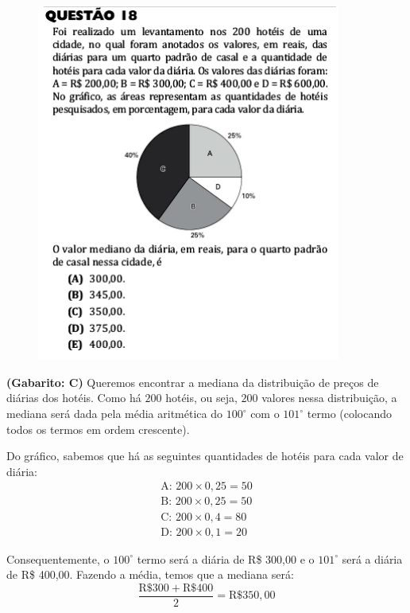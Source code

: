 \documentclass[a4paper]{article}
\begin{document}
\begin{figure}[H]
	\begin{center}
		\includegraphics[width=10cm]{L1Q18.png}
	\end{center}
\end{figure}
\par\textbf{(Gabarito: C)} Queremos encontrar a mediana da distribuição de preços de diárias dos hotéis. Como há $200$ hotéis, ou seja, $200$ valores nessa distribuição, a mediana será dada pela média aritmética do $100^\circ$ com o $101^\circ$ termo (colocando todos os termos em ordem crescente).
\par\vspace{0.3cm} Do gráfico, sabemos que há as seguintes quantidades de hotéis para cada valor de diária:
\begin{align*}
\text{A: }200\times 0,25 = 50 \\
\text{B: }200\times 0,25 = 50 \\
\text{C: }200\times 0,4 = 80 \\
\text{D: }200\times 0,1 = 20
\end{align*}
\par\vspace{0.3cm} Consequentemente, o $100^\circ$ termo será a diária de R\$ 300,00 e o $101^\circ$ será a diária de R\$ 400,00. Fazendo a média, temos que a mediana será:
\begin{equation*}
\frac{\text{R\$}300+\text{R\$}400}{2} = \text{R\$}350,00 
\end{equation*}
\end{document}
